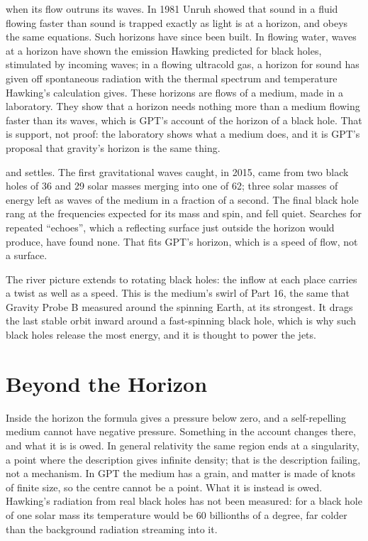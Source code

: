 \documentclass[11pt,a4paper]{article}
\begin{document}
 when its flow outruns its waves. In 1981 Unruh showed that sound in a fluid flowing faster than sound is trapped exactly as light is at a horizon, and obeys the same equations. Such horizons have since been built. In flowing water, waves at a horizon have shown the emission Hawking predicted for black holes, stimulated by incoming waves; in a flowing ultracold gas, a horizon for sound has given off spontaneous radiation with the thermal spectrum and temperature Hawking's calculation gives. These horizons are flows of a medium, made in a laboratory. They show that a horizon needs nothing more than a medium flowing faster than its waves, which is GPT's account of the horizon of a black hole. That is support, not proof: the laboratory shows what a medium does, and it is GPT's proposal that gravity's horizon is the same thing.

 and settles. The first gravitational waves caught, in 2015, came from two black holes of 36 and 29 solar masses merging into one of 62; three solar masses of energy left as waves of the medium in a fraction of a second. The final black hole rang at the frequencies expected for its mass and spin, and fell quiet. Searches for repeated ``echoes'', which a reflecting surface just outside the horizon would produce, have found none. That fits GPT's horizon, which is a speed of flow, not a surface.

 The river picture extends to rotating black holes: the inflow at each place carries a twist as well as a speed. This is the medium's swirl of Part 16, the same that Gravity Probe B measured around the spinning Earth, at its strongest. It drags the last stable orbit inward around a fast-spinning black hole, which is why such black holes release the most energy, and it is thought to power the jets.

\section{Beyond the Horizon}

\begin{openbar}
Inside the horizon the formula gives a pressure below zero, and a self-repelling medium cannot have negative pressure.\footnotemark{} Something in the account changes there, and what it is is owed. In general relativity the same region ends at a singularity, a point where the description gives infinite density; that is the description failing, not a mechanism. In GPT the medium has a grain, and matter is made of knots of finite size, so the centre cannot be a point. What it is instead is owed. Hawking's radiation from real black holes has not been measured: for a black hole of one solar mass its temperature would be 60 billionths of a degree, far colder than the background radiation streaming into it.
\end{openbar}
\end{document}
